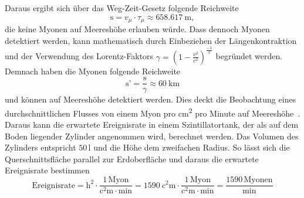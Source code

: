         Daraus ergibt sich über das Weg-Zeit-Gesetz folgende Reichweite
        \begin{equation*}
            \text{s} = v_{\mu} \cdot \tau_{\mu} \approx \SI{658.617}{\metre},
        \end{equation*}
        die keine Myonen auf Meereshöhe erlauben würde. Dass dennoch Myonen detektiert werden, kann mathematisch durch Einbeziehen der Längenkontraktion und der Verwendung des Lorentz-Faktors 
        $\gamma = \left(1 - \frac{v^2}{c^2}\right)^{\frac{-1}{2}}$ begründet werden. Demnach haben die Myonen folgende Reichweite
        \begin{equation*}
            \text{s’} = \frac{\text{s}}{\gamma} \approx \SI{60}{\kilo\metre}
        \end{equation*}
        und können auf Meereshöhe detektiert werden. Dies deckt die Beobachtung eines durchschnittlichen Flusses von einem Myon pro \si{\square\centi\metre} pro Minute auf 
        Meereshöhe~\cite{grupen_einstieg_2018}. Daraus kann die erwartete Ereignisrate in einem Szintillatortank, der als auf dem Boden liegender Zylinder angenommen wird, 
        berechnet werden. Das Volumen des Zylinders entspricht $50\,$l und die Höhe dem zweifachen Radius. So lässt sich die Querschnittsfläche parallel zur Erdoberfläche 
        und daraus die erwartete Ereignisrate bestimmen
        \begin{equation*}
            \text{Ereignisrate} = \text{h}^2 \cdot \frac{1 \, \text{Myon}}{\si{\square\centi\metre} \cdot \si{\minute}} = \SI{1590}{\square\centi\metre} \cdot \frac{1 \, \text{Myon}}{\si{\square\centi\metre} \cdot \si{\minute}} = \frac{1590 \, \text{Myonen}}{\si{\minute}}
        \end{equation*}
